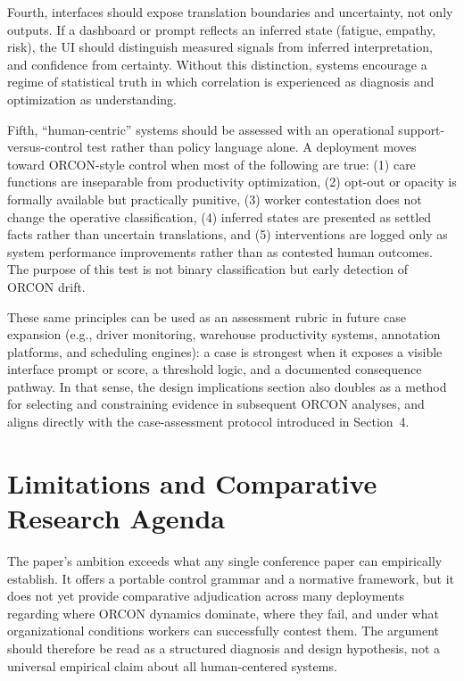 \documentclass[runningheads]{llncs}
\begin{document}
Fourth, interfaces should expose translation boundaries and uncertainty, not only outputs. If a dashboard or prompt reflects an inferred state (fatigue, empathy, risk), the UI should distinguish measured signals from inferred interpretation, and confidence from certainty. Without this distinction, systems encourage a regime of statistical truth in which correlation is experienced as diagnosis and optimization as understanding.

Fifth, ``human-centric'' systems should be assessed with an operational support-versus-control test rather than policy language alone. A deployment moves toward ORCON-style control when most of the following are true: (1) care functions are inseparable from productivity optimization, (2) opt-out or opacity is formally available but practically punitive, (3) worker contestation does not change the operative classification, (4) inferred states are presented as settled facts rather than uncertain translations, and (5) interventions are logged only as system performance improvements rather than as contested human outcomes. The purpose of this test is not binary classification but early detection of ORCON drift.

These same principles can be used as an assessment rubric in future case expansion (e.g., driver monitoring, warehouse productivity systems, annotation platforms, and scheduling engines): a case is strongest when it exposes a visible interface prompt or score, a threshold logic, and a documented consequence pathway. In that sense, the design implications section also doubles as a method for selecting and constraining evidence in subsequent ORCON analyses, and aligns directly with the case-assessment protocol introduced in Section~4.

\section{Limitations and Comparative Research Agenda}

The paper's ambition exceeds what any single conference paper can empirically establish. It offers a portable control grammar and a normative framework, but it does not yet provide comparative adjudication across many deployments regarding where ORCON dynamics dominate, where they fail, and under what organizational conditions workers can successfully contest them. The argument should therefore be read as a structured diagnosis and design hypothesis, not a universal empirical claim about all human-centered systems.
\end{document}
